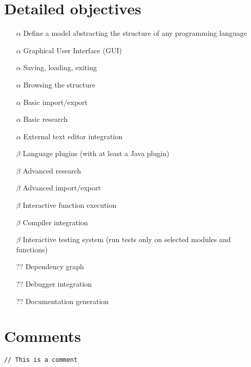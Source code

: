 \documentclass{article}
\begin{document}
\section{Detailed objectives}

\begin{itemize}
	\item [$\alpha$] Define a model abstracting the structure of any programming language
    \item [$\alpha$] Graphical User Interface (GUI)
    \item [$\alpha$] Saving, loading, exiting
    \item [$\alpha$] Browsing the structure
    \item [$\alpha$] Basic import/export
    \item [$\alpha$] Basic research
    \item [$\alpha$] External text editor integration
    
    \item [$\beta$] Language plugins (with at least a Java plugin)
    \item [$\beta$] Advanced research
    \item [$\beta$] Advanced import/export
    \item [$\beta$] Interactive function execution
    \item [$\beta$] Compiler integration
    \item [$\beta$] Interactive testing system (run tests only on selected
        modules and functions)

    \item [??] Dependency graph
    \item [??] Debugger integration
    \item [??] Documentation generation
\end{itemize}

\section{Comments}

\texttt{// This is a comment}
\end{document}
